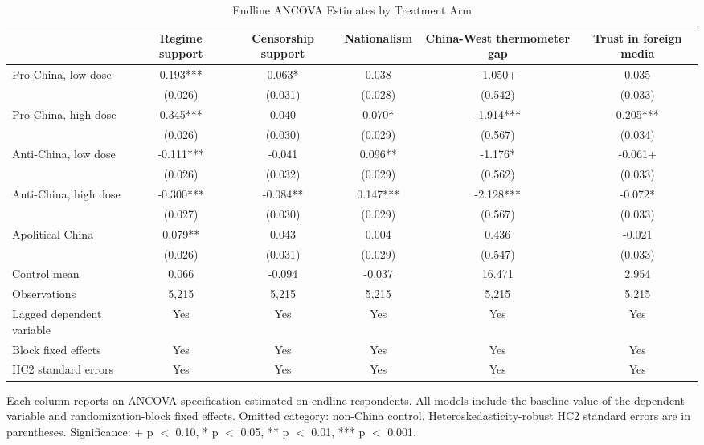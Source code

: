 \begin{table}[H]
\centering
\caption{Endline ANCOVA Estimates by Treatment Arm}
\label{tab:main_ancova_t1}
\footnotesize
\begin{threeparttable}
\begin{tabular}{lccccc}
\toprule
 & Regime support & Censorship support & Nationalism & China-West thermometer gap & Trust in foreign media \\
\midrule
Pro-China, low dose & 0.193*** & 0.063* & 0.038 & -1.050+ & 0.035 \\
 & (0.026) & (0.031) & (0.028) & (0.542) & (0.033) \\
\addlinespace
Pro-China, high dose & 0.345*** & 0.040 & 0.070* & -1.914*** & 0.205*** \\
 & (0.026) & (0.030) & (0.029) & (0.567) & (0.034) \\
\addlinespace
Anti-China, low dose & -0.111*** & -0.041 & 0.096** & -1.176* & -0.061+ \\
 & (0.026) & (0.032) & (0.029) & (0.562) & (0.033) \\
\addlinespace
Anti-China, high dose & -0.300*** & -0.084** & 0.147*** & -2.128*** & -0.072* \\
 & (0.027) & (0.030) & (0.029) & (0.567) & (0.033) \\
\addlinespace
Apolitical China & 0.079** & 0.043 & 0.004 & 0.436 & -0.021 \\
 & (0.026) & (0.031) & (0.029) & (0.547) & (0.033) \\
\addlinespace
\midrule
Control mean & 0.066 & -0.094 & -0.037 & 16.471 & 2.954 \\
Observations & 5,215 & 5,215 & 5,215 & 5,215 & 5,215 \\
Lagged dependent variable & Yes & Yes & Yes & Yes & Yes \\
Block fixed effects & Yes & Yes & Yes & Yes & Yes \\
HC2 standard errors & Yes & Yes & Yes & Yes & Yes \\
\bottomrule
\end{tabular}
\begin{tablenotes}[flushleft]
\footnotesize
\item Each column reports an ANCOVA specification estimated on endline respondents. All models include the baseline value of the dependent variable and randomization-block fixed effects. Omitted category: non-China control. Heteroskedasticity-robust HC2 standard errors are in parentheses. Significance: + p $<$ 0.10, * p $<$ 0.05, ** p $<$ 0.01, *** p $<$ 0.001.
\end{tablenotes}
\end{threeparttable}
\end{table}
